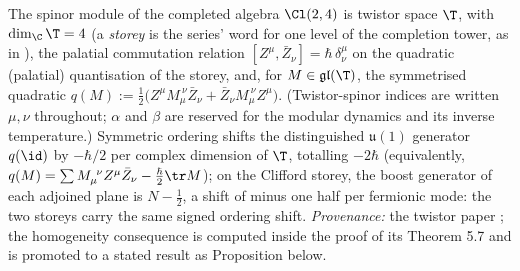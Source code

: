 The spinor module of the completed algebra $\Cl(2,4)$ is twistor space $\T$, with $\dim_\C \T = 4$ (a \emph{storey} is the series' word for one level of the completion tower, as in \cite{ButlerT9}), the palatial commutation relation $[Z^\mu, \bar Z_\nu] = \hbar\,\delta^\mu_\nu$ on the quadratic (palatial) quantisation of the storey, and, for $M \in \mathfrak{gl}(\T)$, the symmetrised quadratic $q(M) := \tfrac12\bigl(Z^\mu M_\mu^{\ \nu}\bar Z_\nu + \bar Z_\nu M_\mu^{\ \nu} Z^\mu\bigr)$. (Twistor-spinor indices are written $\mu, \nu$ throughout; $\alpha$ and $\beta$ are reserved for the modular dynamics and its inverse temperature.) Symmetric ordering shifts the distinguished $\mathfrak{u}(1)$ generator $q(\id)$ by $-\hbar/2$ per complex dimension of $\T$, totalling $-2\hbar$ (equivalently, $q(M) = \sum M_\mu^{\ \nu} Z^\mu \bar Z_\nu - \tfrac{\hbar}{2}\tr M$); on the Clifford storey, the boost generator of each adjoined plane is $N - \tfrac12$, a shift of minus one half per fermionic mode: the two storeys carry the same signed ordering shift. \emph{Provenance:} the twistor paper \cite[Thm.~3.1, Rem.~3.2, \S 5, Lem.~5.5, Prop.~5.6, Thm.~5.7]{ButlerT9}; the homogeneity consequence is computed inside the proof of its Theorem 5.7 and is promoted to a stated result as Proposition  below.
